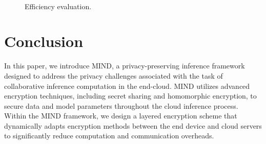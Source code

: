 \documentclass[conference]{IEEEtran}
\begin{document}
\begin{figure}[ht]
    \centering
     \hspace{5pt}
     \\
     \hspace{5pt}
    \caption{Efficiency evaluation.}
    \label{fig:efficiency}
\end{figure}


\section{Conclusion}
In this paper, we introduce MIND, a privacy-preserving inference framework designed to address the privacy challenges associated with the task of collaborative inference computation in the end-cloud. MIND utilizes advanced encryption techniques, including secret sharing and homomorphic encryption, to secure data and model parameters throughout the cloud inference process. Within the MIND framework, we design a layered encryption scheme that dynamically adapts encryption methods between the end device and cloud servers to significantly reduce computation and communication overheads.
\end{document}
